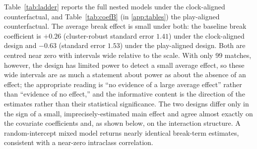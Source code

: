 \documentclass[11pt]{article}
\begin{document}
Table~\ref{tab:ladder} reports the full nested models under the clock-aligned counterfactual, and
Table~\ref{tab:coefB} (in \ref{app:tables}) the play-aligned counterfactual. The average break effect is small under both: the baseline break coefficient is
$+0.26$ (cluster-robust standard error $1.41$) under the clock-aligned design and $-0.63$ (standard error
$1.53$) under the play-aligned design. Both are centred near zero with intervals wide relative to the scale.
With only 99 matches, however, the design has limited power to detect a small average effect, so these wide
intervals are as much a statement about power as about the absence of an effect; the appropriate reading is
``no evidence of a large average effect'' rather than ``evidence of no effect,'' and the informative content is
the direction of the estimates rather than their statistical significance. The two designs differ only in the
sign of a small, imprecisely-estimated main effect and agree almost exactly on the covariate coefficients and,
as shown below, on the interaction structure. A random-intercept
mixed model returns nearly identical break-term estimates, consistent with a near-zero intraclass correlation.
\end{document}
